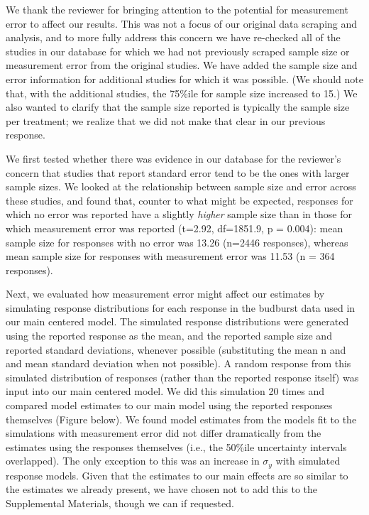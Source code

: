 \documentclass{article}
\begin{document}
\par We thank the reviewer for bringing attention to the potential for measurement error to affect our results. This was not a focus of our original data scraping and analysis, and to more fully address this concern we have re-checked all of the studies in our database for which we had not previously scraped sample size or measurement error from the original studies. We have added the sample size and error information for additional studies for which it was possible. (We should note that, with the additional studies, the 75\%ile for sample size increased to 15.) We also wanted to clarify that the sample size reported is typically the sample size per treatment; we realize that we did not make that clear in our previous response. 
\par We first tested whether there was evidence in our database for the reviewer's concern that studies that report standard error tend to be the ones with larger sample sizes. We looked at the relationship between sample size and error across these studies, and found that, counter to what might be expected,  responses for which no error was reported have a slightly \emph{higher} sample size than in those for which measurement error was reported (t=2.92, df=1851.9, p = 0.004): mean sample size for responses with no error was 13.26 (n=2446 responses), whereas mean sample size for responses with measurement error was 11.53 (n = 364 responses).
\par Next, we evaluated how measurement error might affect our estimates by simulating response distributions for each response in the budburst data used in our main centered model. The simulated response distributions were generated using the reported response as the mean, and the reported sample size and reported standard deviations, whenever possible (substituting the mean n and and mean standard deviation when not possible). A random response from this simulated distribution of responses (rather than the reported response itself) was input into our main centered model. We did this simulation 20 times and compared model estimates to our main model using the reported responses themselves (Figure below). We found model estimates from the models fit to the simulations with measurement error did not differ dramatically from the estimates using the responses themselves (i.e., the 50\%ile uncertainty intervals overlapped). The only exception to this was an increase in $\sigma_{y}$ with simulated response models. 
Given that the estimates to our main effects are so similar to the estimates we already present, we have chosen not to add this to the Supplemental Materials, though we can if requested.\\
\end{document}
